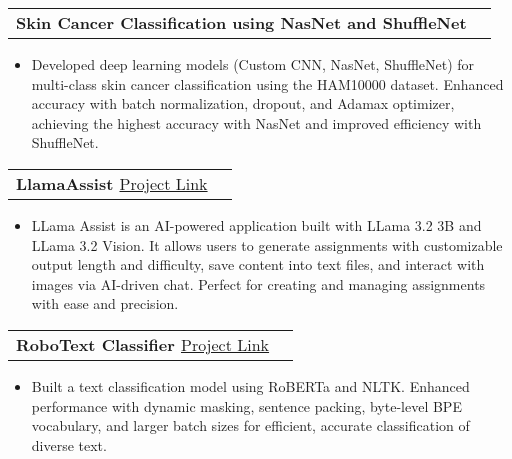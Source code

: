 \documentclass[letterpaper,11pt]{article}
\makeatletter
\newcommand{\resumeItem}[1]{
	\item\small{
		{#1 \vspace{-2pt}}
	}
}
\newcommand{\resumeProjectHeading}[1]{
	\item
	\begin{tabular*}{1.001\textwidth}{l@{\extracolsep{\fill}}r}
		\small#1 & \\
	\end{tabular*}\vspace{-7pt}
}
\newcommand{\resumeItemListStart}{\begin{itemize}}
\newcommand{\resumeItemListEnd}{\end{itemize}\vspace{-5pt}}
\makeatother
\begin{document}
		
%	
	
	\resumeProjectHeading
	{\textbf{\large{Skin Cancer Classification using NasNet and ShuffleNet}}} 
	\resumeItemListStart
	\resumeItem{\normalsize{Developed deep learning models (Custom CNN, NasNet, ShuffleNet) for multi-class skin cancer classification using the HAM10000 dataset. Enhanced accuracy with batch normalization, dropout, and Adamax optimizer, achieving the highest accuracy with NasNet and improved efficiency with ShuffleNet.}}
	\resumeItemListEnd
	\vspace{-15pt}


	\resumeProjectHeading
	{\textbf{\large{{LlamaAssist }}}\href{https://github.com/Dawoodsarfraz/LlamaAssist}{\normalsize{\color{blue} Project Link}}}
	\resumeItemListStart
	\resumeItem{\normalsize LLama Assist is an AI-powered application built with LLama 3.2 3B and LLama 3.2 Vision. It allows users to generate assignments with customizable output length and difficulty, save content into text files, and interact with images via AI-driven chat. Perfect for creating and managing assignments with ease and precision.}
	\resumeItemListEnd
	\vspace{-15pt}
		
	
		\resumeProjectHeading
	{\textbf{\large{{RoboText Classifier }}}\href{https://github.com/Dawoodsarfraz/RoboText-Classifier}{\normalsize{\color{blue} Project Link}}}
	\resumeItemListStart
	\resumeItem{\normalsize Built a text classification model using RoBERTa and NLTK. Enhanced performance with dynamic masking, sentence packing, byte-level BPE vocabulary, and larger batch sizes for efficient, accurate classification of diverse text.}
	\resumeItemListEnd
	\vspace{-15pt}
	
\end{document}
